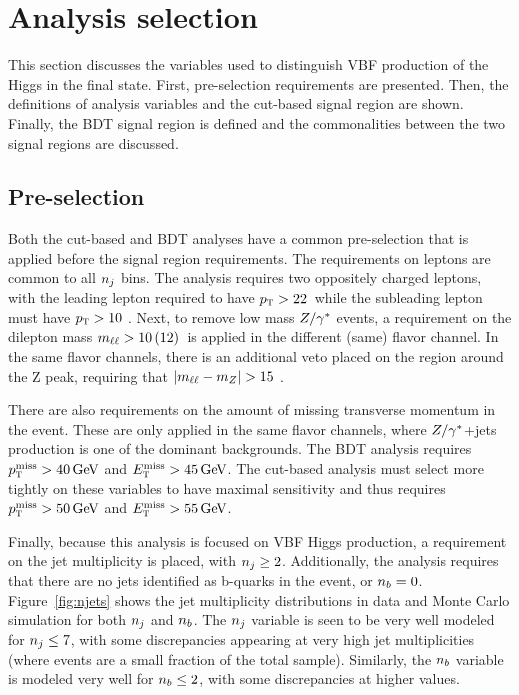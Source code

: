 \section{Analysis selection}

This section discusses the variables used to distinguish VBF production of the Higgs in the \HWWfull final state. First, pre-selection requirements are presented. Then, the definitions of analysis variables and the cut-based signal region are shown. Finally, the BDT signal region is defined and the commonalities between the two signal regions are discussed.  


\subsection{Pre-selection}
\label{sec:vbf_presel}
Both the cut-based and BDT analyses have a common pre-selection that is applied before the signal region requirements. The requirements on leptons are common to all $n_j$ bins. The analysis requires two oppositely charged leptons, with the leading lepton required to have $p_{\textrm{\footnotesize\sc t}} > 22$ \GeV\,while the subleading lepton must have $p_{\textrm{\footnotesize\sc t}} > 10$ \GeV. Next, to remove low mass $Z/\gamma^{\ast}$ events, a requirement on the dilepton mass $m_{\ell\ell} > 10\, (12)$ \GeV\,is applied in the different (same) flavor channel. In the same flavor channels, there is an additional veto placed on the region around the Z peak, requiring that $|m_{\ell\ell} - m_Z| > 15$ \GeV. 

There are also requirements on the amount of missing transverse momentum in the event. These are only applied in the same flavor channels, where $Z/\gamma^{\ast}$+jets production is one of the dominant backgrounds. The BDT analysis requires $\MPTj > 40 \GeV$ and $\MET > 45 \GeV$. The cut-based analysis must select more tightly on these variables to have maximal sensitivity and thus requires $\MPTj > 50 \GeV$ and $\MET > 55 \GeV$. 

Finally, because this analysis is focused on VBF Higgs production, a requirement on the jet multiplicity is placed, with $n_j \geq 2$. Additionally, the analysis requires that there are no jets identified as b-quarks in the event, or $n_b = 0$. Figure~\ref{fig:njets} shows the jet multiplicity distributions in data and Monte Carlo simulation for both $n_j$ and $n_b$. The $n_j$ variable is seen to be very well modeled for $n_j \leq 7$, with some discrepancies appearing at very high jet multiplicities (where events are a small fraction of the total sample). Similarly, the $n_b$ variable is modeled very well for $n_b \leq 2$, with some discrepancies at higher values. 

